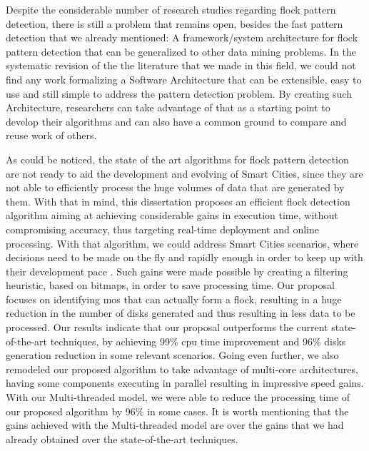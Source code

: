 Despite the considerable number of research studies regarding flock pattern detection, there is still a
problem that remains open, besides the fast pattern detection that we already mentioned: A framework/system architecture
%
%
%
for flock pattern detection that can be generalized to other data mining problems. In the systematic revision of the the
literature that we made in this field, we could not find any work formalizing a Software Architecture that can be
extensible, easy to use and still simple to address the pattern detection problem. By creating such Architecture,
researchers can take advantage of that as a starting point to develop their algorithms and can also have a common ground
to compare and reuse work of others.

As could be noticed, the state of the art algorithms for flock pattern detection are not ready to aid the development
and evolving of Smart Cities, since they are not able to efficiently process the huge volumes of data that are generated
by them. With that in mind, this dissertation proposes an efficient flock detection algorithm aiming at achieving
considerable gains in execution time, without compromising accuracy, thus targeting real-time deployment and online
processing. With that algorithm, we could address Smart Cities scenarios, where decisions need to be made on the fly and
rapidly enough in order to keep up with their development pace \citep{ieeesmartcities}\citep{springersmartcities}. Such
gains were made possible by creating a filtering heuristic, based on bitmaps, in order to save processing time. Our
proposal focuses on identifying \acp{mo} that can actually form a flock, resulting in a huge reduction
in the number of disks generated and thus resulting in less data to be processed. Our results indicate that our proposal
outperforms the current state-of-the-art techniques, by achieving 99\% \ac{cpu} time improvement and 96\% disks
generation reduction in some relevant scenarios. Going even further, we also remodeled our proposed algorithm to take
advantage of multi-core architectures, having some components executing in parallel resulting in impressive speed gains.
With our Multi-threaded model, we were able to reduce the processing time of our proposed algorithm by 96\% in some
cases. It is worth mentioning that the gains achieved with the Multi-threaded model are over the gains that we had
already obtained over the state-of-the-art techniques.

